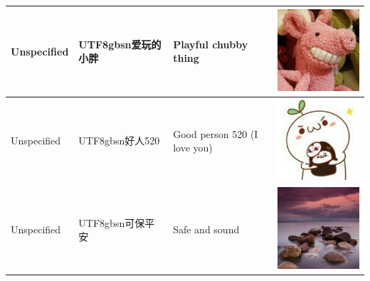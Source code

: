 \documentclass[11pt]{article}
\newcommand{\zh}[1]{\begin{CJK*}{UTF8}{gbsn}#1\end{CJK*}}
\begin{document}
\begin{table}[H]
\begin{tabular}{|p{}|p{}|p{}|p{}|}
	Unspecified & \zh{爱玩的小胖} & Playful chubby thing & \begin{minipage}{.2\textwidth}\includegraphics[width=.45\linewidth, height=.45\linewidth]{figures/ordinary_avatars/o1.jpg}\end{minipage} \\ \hline
	Unspecified & \zh{好人520} & Good person 520 (I love you) & \begin{minipage}{.2\textwidth}\includegraphics[width=.45\linewidth, height=.45\linewidth]{figures/ordinary_avatars/o2.jpg}\end{minipage} \\ \hline
	Unspecified & \zh{可保平安} & Safe and sound & \begin{minipage}{.2\textwidth}\includegraphics[width=.45\linewidth, height=.45\linewidth]{figures/ordinary_avatars/o3.jpg}\end{minipage} \\ \hline
  \end{tabular}
  \label{uids}
\end{table}
\end{document}
